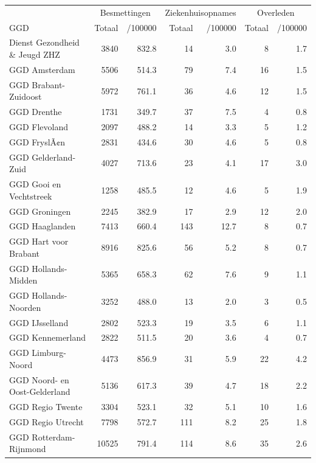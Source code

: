 \documentclass[
  english,
  man,floatsintext]{apa6}
\begin{document}
\begin{table}
\centering\begingroup\fontsize{10}{12}\selectfont

\begin{threeparttable}
\begin{tabular}{lrrrrrr}
\toprule
\multicolumn{1}{c}{ } & \multicolumn{2}{c}{Besmettingen} & \multicolumn{2}{c}{Ziekenhuisopnames} & \multicolumn{2}{c}{Overleden} \\
\cmidrule(l{3pt}r{3pt}){2-3} \cmidrule(l{3pt}r{3pt}){4-5} \cmidrule(l{3pt}r{3pt}){6-7}
GGD & Totaal & /100000 & Totaal & /100000 & Totaal & /100000\\
\midrule
Dienst Gezondheid \& Jeugd ZHZ & 3840 & 832.8 & 14 & 3.0 & 8 & 1.7\\
GGD Amsterdam & 5506 & 514.3 & 79 & 7.4 & 16 & 1.5\\
GGD Brabant-Zuidoost & 5972 & 761.1 & 36 & 4.6 & 12 & 1.5\\
GGD Drenthe & 1731 & 349.7 & 37 & 7.5 & 4 & 0.8\\
GGD Flevoland & 2097 & 488.2 & 14 & 3.3 & 5 & 1.2\\
GGD FryslÃ¢n & 2831 & 434.6 & 30 & 4.6 & 5 & 0.8\\
GGD Gelderland-Zuid & 4027 & 713.6 & 23 & 4.1 & 17 & 3.0\\
GGD Gooi en Vechtstreek & 1258 & 485.5 & 12 & 4.6 & 5 & 1.9\\
GGD Groningen & 2245 & 382.9 & 17 & 2.9 & 12 & 2.0\\
GGD Haaglanden & 7413 & 660.4 & 143 & 12.7 & 8 & 0.7\\
GGD Hart voor Brabant & 8916 & 825.6 & 56 & 5.2 & 8 & 0.7\\
GGD Hollands-Midden & 5365 & 658.3 & 62 & 7.6 & 9 & 1.1\\
GGD Hollands-Noorden & 3252 & 488.0 & 13 & 2.0 & 3 & 0.5\\
GGD IJsselland & 2802 & 523.3 & 19 & 3.5 & 6 & 1.1\\
GGD Kennemerland & 2822 & 511.5 & 20 & 3.6 & 4 & 0.7\\
GGD Limburg-Noord & 4473 & 856.9 & 31 & 5.9 & 22 & 4.2\\
GGD Noord- en Oost-Gelderland & 5136 & 617.3 & 39 & 4.7 & 18 & 2.2\\
GGD Regio Twente & 3304 & 523.1 & 32 & 5.1 & 10 & 1.6\\
GGD Regio Utrecht & 7798 & 572.7 & 111 & 8.2 & 25 & 1.8\\
GGD Rotterdam-Rijnmond & 10525 & 791.4 & 114 & 8.6 & 35 & 2.6\\

\end{tabular}
\end{threeparttable}
\end{table}
\end{document}
